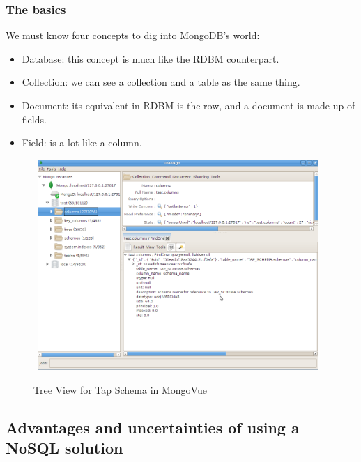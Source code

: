 

\subsubsection{The basics}

We must know four concepts to dig into MongoDB's world:

\begin{itemize}
\item Database: this concept is much like the RDBM counterpart.
\item Collection: we can see a collection and a table as the same thing.
\item Document: its equivalent in RDBM is the row, and a document is made up of fields.
\item Field: is a lot like a column.
\end{itemize}


\begin{figure}
\centering
\includegraphics[width=11cm,height=8cm]{images/mongo_dia.png}\\
\caption{Tree View for Tap Schema in MongoVue}
\end{figure}


\subsection{Advantages and uncertainties of using a NoSQL solution}

